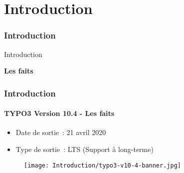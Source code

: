 %

\section{Introduction}
\begin{frame}[fragile]
	\frametitle{Introduction}

	\begin{center}\huge{Introduction}\end{center}
	\begin{center}\huge{\color{typo3darkgrey}\textbf{Les faits}}\end{center}

\end{frame}


\begin{frame}[fragile]
	\frametitle{Introduction}
	\framesubtitle{TYPO3 Version 10.4 - Les faits}

	\begin{itemize}
		\item Date de sortie~: 21 avril 2020
		\item Type de sortie~: LTS (Support à long-terme)
	\end{itemize}

	\begin{figure}
		\texttt{[image: Introduction/typo3-v10-4-banner.jpg]}
	\end{figure}

\end{frame}


